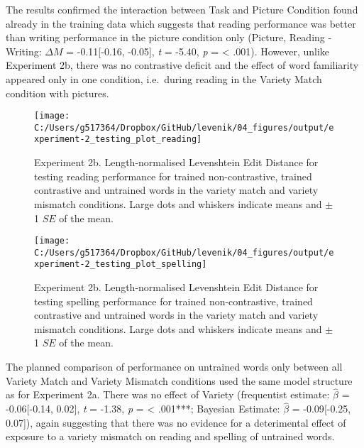 \documentclass[doc,floatsintext]{apa6}
\begin{document}
The results confirmed the interaction between Task and Picture Condition
found already in the training data which suggests that reading
performance was better than writing performance in the picture condition
only (Picture, Reading - Writing: \(\Delta{M}\) = -0.11{[}-0.16,
-0.05{]}, \emph{t} = -5.40, \emph{p} = \textless{} .001). However,
unlike Experiment 2b, there was no contrastive deficit and the effect of
word familiarity appeared only in one condition, i.e.~during reading in
the Variety Match condition with pictures.

\begin{figure}[htb]

{\centering \texttt{[image: C:/Users/g517364/Dropbox/GitHub/levenik/04\_figures/output/experiment-2\_testing\_plot\_reading]} 

}

\caption{Experiment 2b. Length-normalised Levenshtein Edit Distance for testing reading performance for trained non-contrastive, trained contrastive and untrained words in the variety match and variety mismatch conditions. Large dots and whiskers indicate means and $\pm$ 1 $SE$ of the mean.}\label{fig:ex2-test-reading-plots}
\end{figure}

\begin{figure}[htb]

{\centering \texttt{[image: C:/Users/g517364/Dropbox/GitHub/levenik/04\_figures/output/experiment-2\_testing\_plot\_spelling]} 

}

\caption{Experiment 2b. Length-normalised Levenshtein Edit Distance for testing spelling performance for trained non-contrastive, trained contrastive and untrained words in the variety match and variety mismatch conditions. Large dots and whiskers indicate means and $\pm$ 1 $SE$ of the mean.}\label{fig:ex2-test-spelling-plots}
\end{figure}

The planned comparison of performance on untrained words only between
all Variety Match and Variety Mismatch conditions used the same model
structure as for Experiment 2a. There was no effect of Variety
(frequentist estimate: \(\hat{\beta}\) = -0.06{[}-0.14, 0.02{]},
\emph{t} = -1.38, \emph{p} = \textless{} .001***; Bayesian Estimate:
\(\hat{\beta}\) = -0.09{[}-0.25, 0.07{]}), again suggesting that there
was no evidence for a deterimental effect of exposure to a variety
mismatch on reading and spelling of untrained words.
\end{document}
